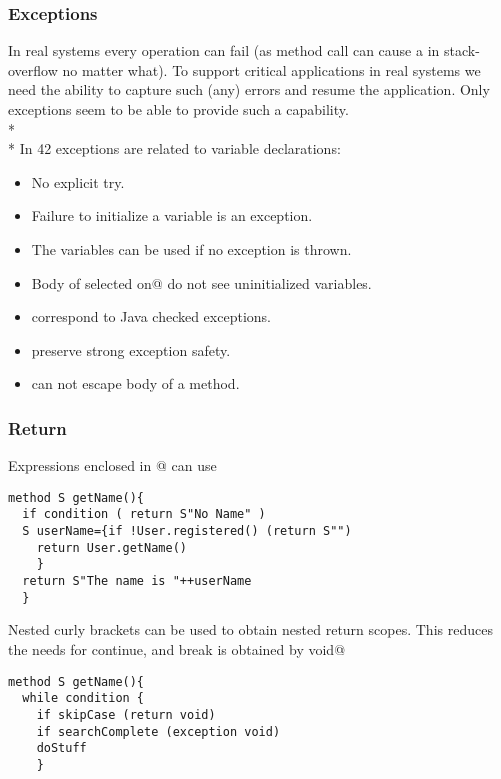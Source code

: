 \begin{frame}[fragile]
\frametitle{Exceptions}
In real systems every operation can fail (as method call can cause
 a in stack-overflow no matter what).
To support critical applications in real systems
 we need the ability to capture such (any) errors and resume the application.
 Only exceptions seem to be able to provide such a capability.
\\*${}_{}$\\*
In 42 exceptions are related to variable declarations:
\begin{itemize}
\item No explicit \alert{try}.
\item Failure to initialize a variable is an exception.
\item The variables can be used if no exception is thrown.
\item Body of selected \Q@catch on@ do not see uninitialized variables.
\item \Q@exception@ correspond to Java checked exceptions.
\item \Q@error@ preserve strong exception safety.
\item \Q@return@ can not escape body of a method.
\end{itemize}
\end{frame}

\begin{frame}[fragile]
\frametitle{Return}
Expressions enclosed in @ can use \Q@return@
\begin{NiceCode}{59ex}{0.8}
\begin{lstlisting}
method S getName(){
  if condition ( return S"No Name" )
  S userName={if !User.registered() (return S"")
    return User.getName()
    }  
  return S"The name is "++userName
  }
\end{lstlisting}
\end{NiceCode}
Nested curly brackets can be used to obtain nested return scopes.
This reduces the needs for continue, and break is obtained by
\Q@exception void@

\begin{NiceCode}{59ex}{0.8}
\begin{lstlisting}
method S getName(){
  while condition {
    if skipCase (return void)
    if searchComplete (exception void)
    doStuff
    }
\end{lstlisting}
\end{NiceCode}

\end{frame}

